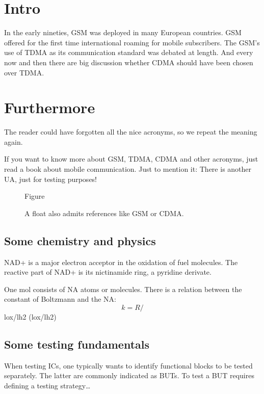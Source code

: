 \documentclass{article}
\begin{document}
\section{Intro}
In the early nineties, \acs{GSM} was deployed in many European
countries. \ac{GSM} offered for the first time international
roaming for mobile subscribers. The \acs{GSM}'s use of \ac{TDMA} as
its communication standard was debated at length. And every now
and then there are big discussion whether \ac{CDMA} should have
been chosen over \ac{TDMA}.

\section{Furthermore}
\acresetall
The reader could have forgotten all the nice acronyms, so we repeat the
meaning again.

If you want to know more about \acf{GSM}, \acf{TDMA}, \acf{CDMA}
and other acronyms, just read a book about mobile communication. Just
to mention it: There is another \ac{UA}, just for testing purposes!

\begin{figure}[h]
Figure
\caption{A float also admits references like \ac{GSM} or \acf{CDMA}.}
\end{figure}

\subsection{Some chemistry and physics}
\label{Chem}
\ac{NAD+} is a major electron acceptor in the oxidation
of fuel molecules. The reactive part of \ac{NAD+} is its nictinamide
ring, a pyridine derivate.

One mol consists of \acs{NA} atoms or molecules. There is a relation
between the constant of Boltzmann and the \acl{NA}:
\begin{equation}
  k = R/%
\end{equation}
\acl{lox}/\acl{lh2} (\acs{lox}/\acs{lh2})
\subsection{Some testing fundamentals}
When testing \acp{IC}, one typically wants to identify functional
blocks to be tested separately. The latter are commonly indicated as
\acp{BUT}. To test a \ac{BUT} requires defining a testing strategy\dots

\printacronyms
\end{document}
